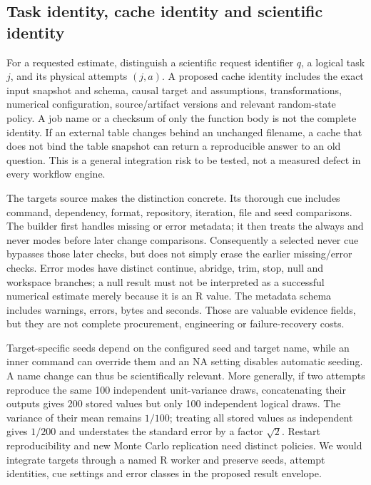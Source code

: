 \subsection{Task identity, cache identity and scientific identity}

For a requested estimate, distinguish a scientific request identifier $q$, a logical task $j$, and its physical attempts $(j,a)$. A proposed cache identity includes the exact input snapshot and schema, causal target and assumptions, transformations, numerical configuration, source/artifact versions and relevant random-state policy. A job name or a checksum of only the function body is not the complete identity. If an external table changes behind an unchanged filename, a cache that does not bind the table snapshot can return a reproducible answer to an old question. This is a general integration risk to be tested, not a measured defect in every workflow engine.~\citep{exec25_dww_choice,exec24_openlineage_source,exec24_openlineage_reference}

The targets source makes the distinction concrete. Its thorough cue includes command, dependency, format, repository, iteration, file and seed comparisons. The builder first handles missing or error metadata; it then treats the always and never modes before later change comparisons. Consequently a selected never cue bypasses those later checks, but does not simply erase the earlier missing/error checks. Error modes have distinct continue, abridge, trim, stop, null and workspace branches; a null result must not be interpreted as a successful numerical estimate merely because it is an R value. The metadata schema includes warnings, errors, bytes and seconds. Those are valuable evidence fields, but they are not complete procurement, engineering or failure-recovery costs.~\citep{exec25_dww_targets}

Target-specific seeds depend on the configured seed and target name, while an inner command can override them and an NA setting disables automatic seeding. A name change can thus be scientifically relevant. More generally, if two attempts reproduce the same 100 independent unit-variance draws, concatenating their outputs gives 200 stored values but only 100 independent logical draws. The variance of their mean remains $1/100$; treating all stored values as independent gives $1/200$ and understates the standard error by a factor $\sqrt{2}$. Restart reproducibility and new Monte Carlo replication need distinct policies. We would integrate targets through a named R worker and preserve seeds, attempt identities, cue settings and error classes in the proposed result envelope.~\citep{exec25_dww_targets,exec25_dww_choice}

